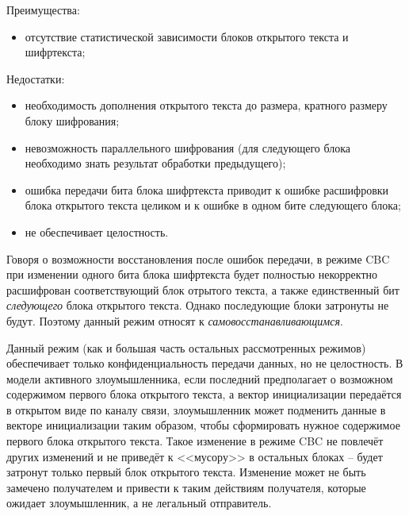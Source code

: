 Преимущества:
\begin{itemize}
	\item отсутствие статистической зависимости блоков открытого текста и шифртекста;
\end{itemize}

Недостатки:
\begin{itemize}
	\item необходимость дополнения открытого текста до размера, кратного размеру блоку шифрования;
	\item невозможность параллельного шифрования (для следующего блока необходимо знать результат обработки предыдущего);
	\item ошибка передачи бита блока шифртекста приводит к ошибке расшифровки блока открытого текста целиком и к ошибке в одном бите следующего блока;
	\item не обеспечивает целостность.
\end{itemize}

Говоря о возможности восстановления после ошибок передачи, в режиме CBC при изменении одного бита блока шифртекста будет полностью некорректно расшифрован соответствующий блок отрытого текста, а также единственный бит \emph{следующего} блока открытого текста. Однако последующие блоки затронуты не будут. Поэтому данный режим относят к \emph{самовосстанавливающимся}.

Данный режим (как и большая часть остальных рассмотренных режимов) обеспечивает только конфиденциальность передачи данных, но не целостность. В модели активного злоумышленника, если последний предполагает о возможном содержимом первого блока открытого текста, а вектор инициализации передаётся в открытом виде по каналу связи, злоумышленник может подменить данные в векторе инициализации таким образом, чтобы сформировать нужное содержимое первого блока открытого текста. Такое изменение в режиме CBC не повлечёт других изменений и не приведёт к <<мусору>> в остальных блоках -- будет затронут только первый блок открытого текста. Изменение может не быть замечено получателем и привести к таким действиям получателя, которые ожидает злоумышленник, а не легальный отправитель.